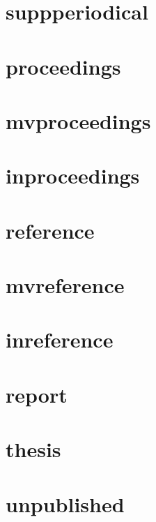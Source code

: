 \documentclass[a4paper]{article}
\begin{document}
\cite[1]{periodical}

\cite[1]{periodical}

\section{suppperiodical}

\cite[1]{suppperiodical}

\cite[1]{suppperiodical}

\section{proceedings}

\cite[1]{proceedings}

\cite[1]{proceedings}

\section{mvproceedings}

\cite[1]{mvproceedings}

\cite[1]{mvproceedings}

\section{inproceedings}

\cite[1]{inproceedings}

\cite[1]{inproceedings}

\section{reference}

\cite[1]{reference}

\cite[1]{reference}

\section{mvreference}

\cite[1]{mvreference}

\cite[1]{mvreference}

\section{inreference}

\cite[1]{inreference}

\cite[1]{inreference}

\section{report}

\cite[1]{report}

\cite[1]{report}

\section{thesis}

\cite[1]{thesis}

\cite[1]{thesis}

\section{unpublished}

\cite[1]{unpublished}

\cite[1]{unpublished}


\printbibliography
\end{document}
